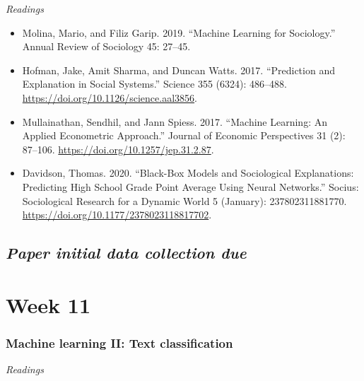 \documentclass[
  10pt,
]{article}
\providecommand{\tightlist}{%
  \setlength{\itemsep}{0pt}\setlength{\parskip}{0pt}}
\begin{document}
\emph{Readings}

\begin{itemize}
\tightlist
\item
  Molina, Mario, and Filiz Garip. 2019. ``Machine Learning for
  Sociology.'' Annual Review of Sociology 45: 27--45.
\item
  Hofman, Jake, Amit Sharma, and Duncan Watts. 2017. ``Prediction and
  Explanation in Social Systems.'' Science 355 (6324): 486--488.
  \url{https://doi.org/10.1126/science.aal3856}.
\item
  Mullainathan, Sendhil, and Jann Spiess. 2017. ``Machine Learning: An
  Applied Econometric Approach.'' Journal of Economic Perspectives 31
  (2): 87--106. \url{https://doi.org/10.1257/jep.31.2.87}.
\item
  Davidson, Thomas. 2020. ``Black-Box Models and Sociological
  Explanations: Predicting High School Grade Point Average Using Neural
  Networks.'' Socius: Sociological Research for a Dynamic World 5
  (January): 237802311881770.
  \url{https://doi.org/10.1177/2378023118817702}.
\end{itemize}

\hypertarget{paper-initial-data-collection-due}{%
\subsection{\texorpdfstring{\emph{Paper initial data collection
due}}{Paper initial data collection due}}\label{paper-initial-data-collection-due}}

\hypertarget{week-11}{%
\section{Week 11}\label{week-11}}

\hypertarget{machine-learning-ii-text-classification}{%
\subsubsection{Machine learning II: Text
classification}\label{machine-learning-ii-text-classification}}

\emph{Readings}
\end{document}

